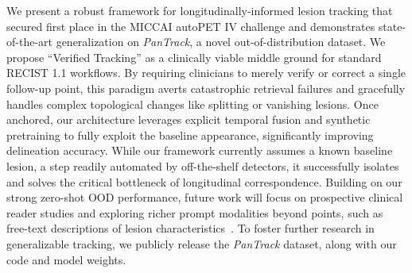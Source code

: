 We present a robust framework for longitudinally-informed lesion tracking that secured first place in the MICCAI autoPET IV challenge and demonstrates state-of-the-art generalization on \textit{PanTrack}, a novel out-of-distribution dataset. We propose ``Verified Tracking'' as a clinically viable middle ground for standard RECIST 1.1 workflows. By requiring clinicians to merely verify or correct a single follow-up point, this paradigm averts catastrophic retrieval failures and gracefully handles complex topological changes like splitting or vanishing lesions. Once anchored, our architecture leverages explicit temporal fusion and synthetic pretraining to fully exploit the baseline appearance, significantly improving delineation accuracy. While our framework currently assumes a known baseline lesion, a step readily automated by off-the-shelf detectors, it successfully isolates and solves the critical bottleneck of longitudinal correspondence. Building on our strong zero-shot OOD performance, future work will focus on prospective clinical reader studies and exploring richer prompt modalities beyond points, such as free-text descriptions of lesion characteristics~\cite{Rokuss_2026_CVPR}. To foster further research in generalizable tracking, we publicly release the \textit{PanTrack} dataset, along with our code and model weights.
